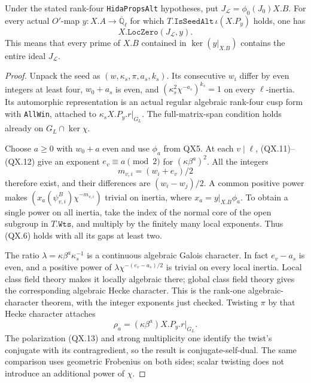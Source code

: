 \begin{proposition}
\label{claim:QX7}
Under the stated rank-four \texttt{HidaPropsAlt} hypotheses,
put $J_{\mathcal L}=\phi_0(J_0)X.B$.  For every actual
$O'$-map $y:X.A\to\overline{\mathbb Q}_\ell$ for which
$T.\texttt{IsSeedAlt}\,\iota(X.P_y)$ holds, one has
\[
                  X.\texttt{LocZero}(J_{\mathcal L},y).
                  \tag{QX.18}
\]
This means that every prime of $X.B$ contained in
$\ker(y|_{X.B})$ contains the entire ideal
$J_{\mathcal L}$.
\end{proposition}
\begin{proof}
Unpack the seed as $(w,\kappa_s,\pi,a_s,k_s)$.
Its consecutive $w_i$ differ by even integers at least
four, $w_0+a_s$ is even, and
$(\kappa_s^2\chi^{-a_s})^{k_s}=1$ on every $\ell$-inertia.
Its automorphic representation is an actual regular
algebraic rank-four cusp form with \texttt{AllWin}, attached
to $\kappa_s X.P_y.r|_{G_L}$.  The full-matrix-span condition
holds already on $G_L\cap\ker\chi$.

Choose $a\ge0$ with $w_0+a$ even and use $\phi_a$ from QX5.
At each $v\mid\ell$, (QX.11)--(QX.12) give an exponent
$e_v\equiv a\pmod2$ for
$(\kappa\beta^a)^2$.  All the integers
\[
               m_{v,i}=(w_i+e_v)/2
               \tag{QX.19}
\]
therefore exist, and their differences are
$(w_i-w_j)/2$.  A common positive power makes
$(x_a(\psi^B_{v,i})\chi^{-m_{v,i}})$ trivial on inertia,
where $x_a=y|_{X.B}\phi_a$.  To obtain a single power on
all inertia, take the index of the normal core of the
open subgroup in $T.\texttt{Wts}$, and multiply by the
finitely many local exponents.  Thus (QX.6) holds with
all its gaps at least two.

The ratio $\lambda=\kappa\beta^a\kappa_s^{-1}$ is a
continuous algebraic Galois character.  In fact
$e_v-a_s$ is even, and a positive power of
$\lambda\chi^{-(e_v-a_s)/2}$ is trivial on every local
inertia.  Local class field theory makes it locally
algebraic there; global class field theory gives the
corresponding algebraic Hecke character.  This is the
rank-one algebraic-character theorem, with the integer
exponents just checked.  Twisting $\pi$ by that Hecke
character attaches
\[
                 \rho_a=(\kappa\beta^a)X.P_y.r|_{G_L}.
                 \tag{QX.20}
\]
The polarization (QX.13) and strong multiplicity one
identify the twist's conjugate with its contragredient,
so the result is conjugate-self-dual.  The same comparison
uses geometric Frobenius on both sides; scalar twisting
does not introduce an additional power of $\chi$.


\end{proof}
